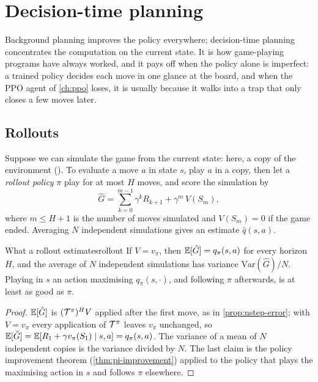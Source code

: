 \section{Decision-time planning}

Background planning improves the policy everywhere; decision-time planning
concentrates the computation on the current state. It is how game-playing
programs have always worked, and it pays off when the policy alone is
imperfect: a trained policy decides each move in one glance at the board,
and when the PPO agent of \cref{ch:ppo} loses, it is usually because it
walks into a trap that only closes a few moves later.

\subsection{Rollouts}

Suppose we can simulate the game from the current state: here, a copy of
the environment (). To evaluate a move $a$
in state $s$, play $a$ in a copy, then let a \emph{rollout policy} $\pi$
play for at most $H$ moves, and score the simulation by
\begin{equation}
  \label{eq:rollout-return}
  \hat G = \sum_{k=0}^{m-1} \gamma^k R_{k+1} + \gamma^m\, V(S_m),
\end{equation}
where $m \leq H + 1$ is the number of moves simulated and $V(S_m) = 0$ if
the game ended. Averaging $N$ independent simulations gives an estimate
$\hat q(s, a)$.

\begin{proposition}{What a rollout estimates}{rollout}
  If $V = v_\pi$, then $\mathbb{E}[\hat G] = q_\pi(s, a)$ for every horizon $H$,
  and the average of $N$ independent simulations has variance
  $\mathrm{Var}(\hat G) / N$. Playing in $s$ an action maximising $q_\pi(s,
  \cdot)$, and following $\pi$ afterwards, is at least as good as $\pi$.
\end{proposition}

\begin{proof}
  $\mathbb{E}[\hat G]$ is $(\mathcal{T}^\pi)^{H} V$ applied after the first move, as in
  \cref{prop:nstep-error}; with $V = v_\pi$ every application of $\mathcal{T}^\pi$
  leaves $v_\pi$ unchanged, so $\mathbb{E}[\hat G] = \mathbb{E}[R_1 + \gamma v_\pi(S_1)
  \mid s, a] = q_\pi(s, a)$. The variance of a mean of $N$ independent
  copies is the variance divided by $N$. The last claim is the policy
  improvement theorem (\cref{thm:pi-improvement}) applied to the policy
  that plays the maximising action in $s$ and follows $\pi$ elsewhere.
\end{proof}

